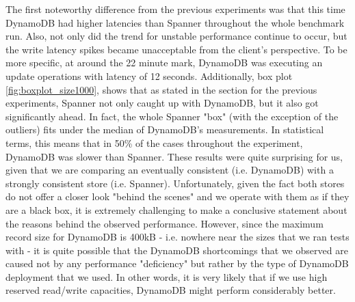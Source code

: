 \documentclass[letterpaper, 10 pt, conference]{ieeeconf}  %
\begin{document}
The first noteworthy difference from the previous experiments was that this time DynamoDB had higher latencies than Spanner throughout the whole benchmark run. Also, not only did the trend for unstable performance continue to occur, but the write latency spikes became unacceptable from the client's perspective. To be more specific, at around the 22 minute mark, DynamoDB was executing an update operations with latency of 12 seconds. Additionally, box plot \ref{fig:boxplot_size1000}, shows that as stated in the section for the previous experiments, Spanner not only caught up with DynamoDB, but it also got significantly ahead. In fact, the whole Spanner "box" (with the exception of the outliers) fits under the median of DynamoDB's measurements. In statistical terms, this means that in 50\% of the cases throughout the experiment, DynamoDB was slower than Spanner. These results were quite surprising for us, given that we are comparing an eventually consistent (i.e. DynamoDB) with a strongly consistent store (i.e. Spanner). Unfortunately, given the fact both stores do not offer a closer look "behind the scenes" and we operate with them as if they are a black box, it is extremely challenging to make a conclusive statement about the reasons behind the observed performance. However, since the maximum record size for DynamoDB is 400kB - i.e. nowhere near the sizes that we ran tests with - it is quite possible that the DynamoDB shortcomings that we observed are caused not by any performance "deficiency" but rather  by the type of DynamoDB deployment that we used. In other words, it is very likely that if we use high reserved read/write capacities, DynamoDB might perform considerably better.
\end{document}
